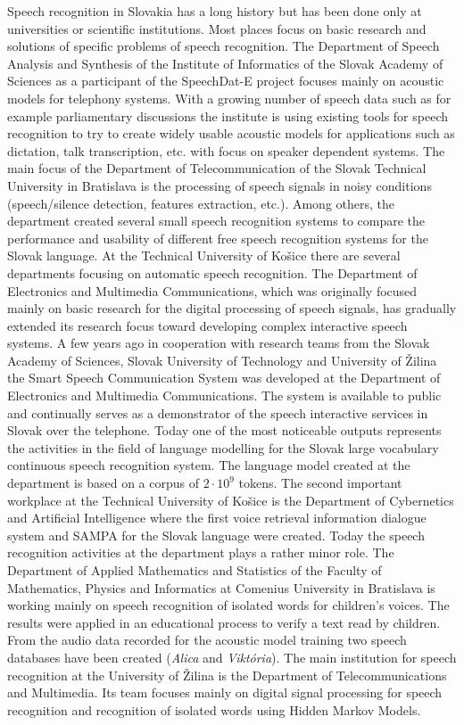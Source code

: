 \begin{multicols}{2}
Speech recognition in Slovakia has a long history but has been done only at universities or scientific institutions. Most places focus on basic research and solutions of specific problems of speech recognition. The Department of Speech Analysis and Synthesis of the Institute of Informatics of the Slovak Academy of Sciences as a participant of the SpeechDat-E project focuses mainly on acoustic models for telephony systems. With a growing number of speech data such as for example parliamentary discussions the institute is using existing tools for speech recognition to try to create widely usable acoustic models for applications such as dictation, talk transcription, etc. with focus on speaker dependent systems. The main focus of the Department of Telecommunication of the Slovak Technical University in Bratislava is the processing of speech signals in noisy conditions (speech/silence detection, features extraction, etc.). Among others, the department created several small speech recognition systems to compare the performance and usability of different free speech recognition systems for the Slovak language. At the Technical University of Košice there are several departments focusing on automatic speech recognition. The Department of Electronics and Multimedia Communications, which was originally focused mainly on basic research for the digital processing of speech signals, has gradually extended its research focus toward developing complex interactive speech systems. A few years ago in cooperation with research teams from the Slovak Academy of Sciences, Slovak University of Technology and University of Žilina the Smart Speech Communication System was developed at the Department of Electronics and Multimedia Communications. The system is available to public and continually serves as a demonstrator of the speech interactive services in Slovak over the telephone. Today one of the most noticeable outputs represents the activities in the field of language modelling for the Slovak large vocabulary continuous speech recognition system. The language model created at the department is based on a corpus of $2\cdot 10^9$ tokens. 
\newline The second important workplace at the Technical University of Košice is the Department of Cybernetics and Artificial Intelligence where the first voice retrieval information dialogue system and SAMPA for the Slovak language were created. Today the speech recognition activities at the department plays a rather minor role. The Department of Applied Mathematics and Statistics of the Faculty of Mathematics, Physics and Informatics at Comenius University in Bratislava is working mainly on speech recognition of isolated words for children's voices. The results were applied in an educational process to verify a text read by children. From the audio data recorded for the acoustic model training two speech databases have been created (\emph{Alica} and \emph{Viktória}).  The main institution for speech recognition at the University of Žilina is the Department of Telecommunications and Multimedia. Its team focuses mainly on digital signal processing for speech recognition and recognition of isolated words using Hidden Markov Models.


\end{multicols}
